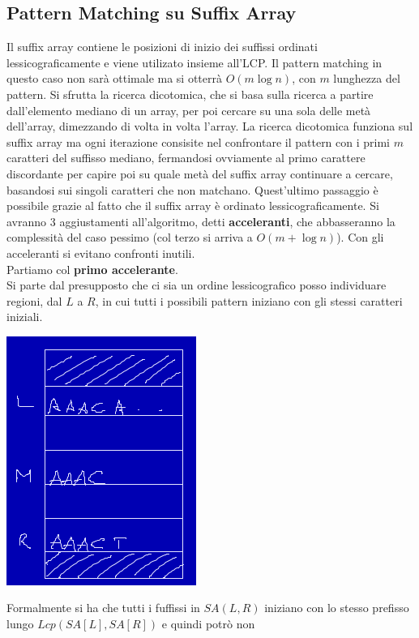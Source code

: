 \documentclass[a4paper,12pt, oneside]{book}
\begin{document}
\subsection{Pattern Matching su Suffix Array}
Il suffix array contiene le posizioni di inizio dei suffissi ordinati
lessicograficamente e viene utilizato insieme all'LCP. Il pattern
matching in questo caso non sarà ottimale ma si
otterrà $O(m\log n)$, con $m$ lunghezza del pattern. Si sfrutta la
ricerca dicotomica, che si basa sulla ricerca a partire dall'elemento
mediano di un array, per poi cercare su una sola delle metà
dell'array, dimezzando di volta in volta l'array. La ricerca
dicotomica funziona sul suffix array ma ogni iterazione consisite nel
confrontare il pattern con i primi $m$ caratteri del suffisso mediano,
fermandosi ovviamente al primo carattere discordante per capire poi su
quale metà del suffix array continuare a cercare, basandosi sui
singoli caratteri che non matchano. Quest'ultimo passaggio è possibile
grazie al fatto che il suffix array è ordinato lessicograficamente. Si
avranno 3 aggiustamenti all'algoritmo, detti \textbf{acceleranti}, che
abbasseranno la complessità del caso pessimo (col terzo si arriva a
$O(m+\log n)$). Con gli acceleranti si evitano confronti inutili.
\\Partiamo col \textbf{primo accelerante}.\\
Si parte dal presupposto che ci sia un ordine lessicografico posso
individuare regioni, dal $L$ a $R$, in cui tutti i possibili pattern
iniziano con gli stessi caratteri iniziali.
\begin{center}
  \includegraphics[scale = 0.5]{img/arr.png}
\end{center}
Formalmente si ha che tutti i fuffissi in $SA(L,R)$ iniziano con lo
stesso prefisso lungo $Lcp(SA[L], SA[R])$ e quindi potrò non
\end{document}
